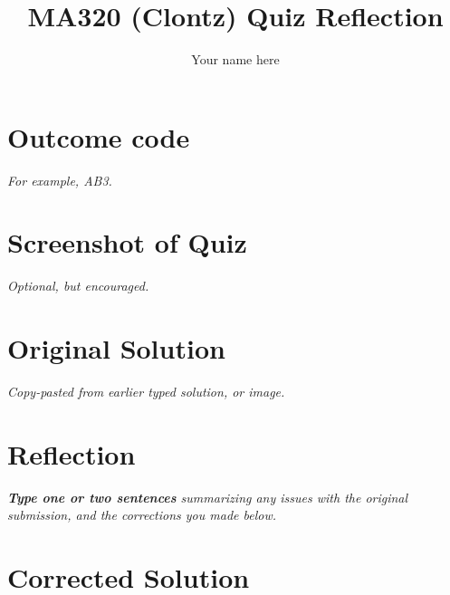 \documentclass{article}
\title{MA320 (Clontz) Quiz Reflection}
\author{Your name here}
\begin{document}
\maketitle

\section{Outcome code}
\textit{For example, AB3.}





\section{Screenshot of Quiz}
\textit{Optional, but encouraged.}





\section{Original Solution}
\textit{Copy-pasted from earlier typed solution, or image.}









\section{Reflection}
\textit{\textbf{Type one or two sentences} summarizing any issues with the
original submission, and the corrections you made below.}








\section{Corrected Solution}

\end{document}
